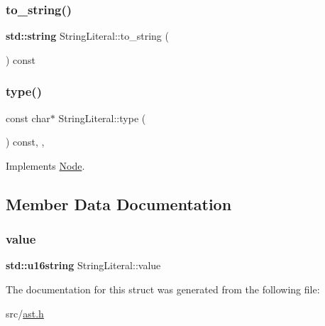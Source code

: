 \subsubsection{\texorpdfstring{to\+\_\+string()}{to\_string()}}
{\footnotesize\ttfamily \textbf{ std\+::string} String\+Literal\+::to\+\_\+string (\begin{DoxyParamCaption}{ }\end{DoxyParamCaption}) const\hspace{0.3cm}{\ttfamily [inline]}}

\mbox{\label{struct_string_literal_ad9f83f67d287ea9d871a39672a3e64a9}} 
\subsubsection{\texorpdfstring{type()}{type()}}
{\footnotesize\ttfamily const char$\ast$ String\+Literal\+::type (\begin{DoxyParamCaption}{ }\end{DoxyParamCaption}) const\hspace{0.3cm}{\ttfamily [inline]}, {\ttfamily [override]}, {\ttfamily [virtual]}}



Implements \hyperlink{struct_node_a82f29420d0a38efcc370352528e94e9b}{Node}.



\subsection{Member Data Documentation}
\mbox{\label{struct_string_literal_a6e41d06a20217417a1bf70171235a711}} 
\subsubsection{\texorpdfstring{value}{value}}
{\footnotesize\ttfamily \textbf{ std\+::u16string} String\+Literal\+::value}



The documentation for this struct was generated from the following file\+:\begin{DoxyCompactItemize}
\item 
src/\hyperlink{ast_8h}{ast.\+h}\end{DoxyCompactItemize}
